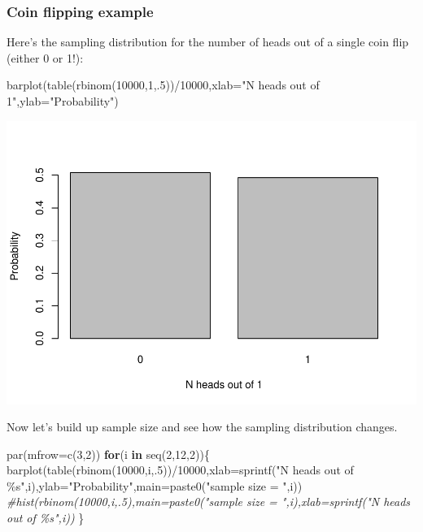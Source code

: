 \documentclass[
]{article}
\newenvironment{Shaded}{\begin{snugshade}}{\end{snugshade}}
\newcommand{\AttributeTok}[1]{\textcolor[rgb]{0.77,0.63,0.00}{#1}}
\newcommand{\CommentTok}[1]{\textcolor[rgb]{0.56,0.35,0.01}{\textit{#1}}}
\newcommand{\ControlFlowTok}[1]{\textcolor[rgb]{0.13,0.29,0.53}{\textbf{#1}}}
\newcommand{\DecValTok}[1]{\textcolor[rgb]{0.00,0.00,0.81}{#1}}
\newcommand{\FunctionTok}[1]{\textcolor[rgb]{0.00,0.00,0.00}{#1}}
\newcommand{\NormalTok}[1]{#1}
\newcommand{\SpecialCharTok}[1]{\textcolor[rgb]{0.00,0.00,0.00}{#1}}
\newcommand{\StringTok}[1]{\textcolor[rgb]{0.31,0.60,0.02}{#1}}
\begin{document}
\hypertarget{coin-flipping-example}{%
\subsubsection{Coin flipping example}\label{coin-flipping-example}}

Here's the sampling distribution for the number of heads out of a single
coin flip (either 0 or 1!):

\begin{Shaded}
\begin{Highlighting}[]
\FunctionTok{barplot}\NormalTok{(}\FunctionTok{table}\NormalTok{(}\FunctionTok{rbinom}\NormalTok{(}\DecValTok{10000}\NormalTok{,}\DecValTok{1}\NormalTok{,.}\DecValTok{5}\NormalTok{))}\SpecialCharTok{/}\DecValTok{10000}\NormalTok{,}\AttributeTok{xlab=}\StringTok{"N heads out of 1"}\NormalTok{,}\AttributeTok{ylab=}\StringTok{"Probability"}\NormalTok{)}
\end{Highlighting}
\end{Shaded}

\includegraphics{LECTURE2_files/figure-latex/unnamed-chunk-8-1.pdf}

Now let's build up sample size and see how the sampling distribution
changes.

\begin{Shaded}
\begin{Highlighting}[]
\FunctionTok{par}\NormalTok{(}\AttributeTok{mfrow=}\FunctionTok{c}\NormalTok{(}\DecValTok{3}\NormalTok{,}\DecValTok{2}\NormalTok{))}
\ControlFlowTok{for}\NormalTok{(i }\ControlFlowTok{in} \FunctionTok{seq}\NormalTok{(}\DecValTok{2}\NormalTok{,}\DecValTok{12}\NormalTok{,}\DecValTok{2}\NormalTok{))\{}
   \FunctionTok{barplot}\NormalTok{(}\FunctionTok{table}\NormalTok{(}\FunctionTok{rbinom}\NormalTok{(}\DecValTok{10000}\NormalTok{,i,.}\DecValTok{5}\NormalTok{))}\SpecialCharTok{/}\DecValTok{10000}\NormalTok{,}\AttributeTok{xlab=}\FunctionTok{sprintf}\NormalTok{(}\StringTok{"N heads out of \%s"}\NormalTok{,i),}\AttributeTok{ylab=}\StringTok{"Probability"}\NormalTok{,}\AttributeTok{main=}\FunctionTok{paste0}\NormalTok{(}\StringTok{"sample size = "}\NormalTok{,i))}
   \CommentTok{\#hist(rbinom(10000,i,.5),main=paste0("sample size = ",i),xlab=sprintf("N heads out of \%s",i)) }
\NormalTok{\}}
\end{Highlighting}
\end{Shaded}
\end{document}
